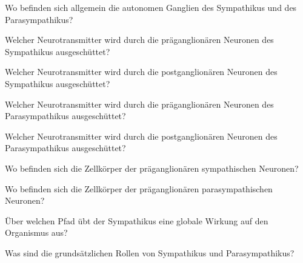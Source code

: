 \documentclass[10pt, a4paper]{exam}
\begin{document}
\begin{questions}
\begin{solution}
  \end{solution}

  \question Wo befinden sich allgemein die autonomen Ganglien des Sympathikus und des Parasympathikus?
  \begin{solution}

  \end{solution}

  \question Welcher Neurotransmitter wird durch die präganglionären Neuronen des Sympathikus ausgeschüttet?
  \begin{solution}

  \end{solution}

  \question Welcher Neurotransmitter wird durch die postganglionären Neuronen des Sympathikus ausgeschüttet?
  \begin{solution}

  \end{solution}

  \question Welcher Neurotransmitter wird durch die präganglionären Neuronen des Parasympathikus ausgeschüttet?
  \begin{solution}

  \end{solution}

  \question Welcher Neurotransmitter wird durch die postganglionären Neuronen des Parasympathikus ausgeschüttet?
  \begin{solution}

  \end{solution}

  \question Wo befinden sich die Zellkörper der präganglionären sympathischen Neuronen?
  \begin{solution}

  \end{solution}

  \question Wo befinden sich die Zellkörper der präganglionären parasympathischen Neuronen?
  \begin{solution}

  \end{solution}

  \question Über welchen Pfad übt der Sympathikus eine globale Wirkung auf den Organismus aus?
  \begin{solution}

  \end{solution}

  \question Was sind die grundsätzlichen Rollen von Sympathikus und Parasympathikus?
  \begin{solution}


\end{solution}
\end{questions}
\end{document}
